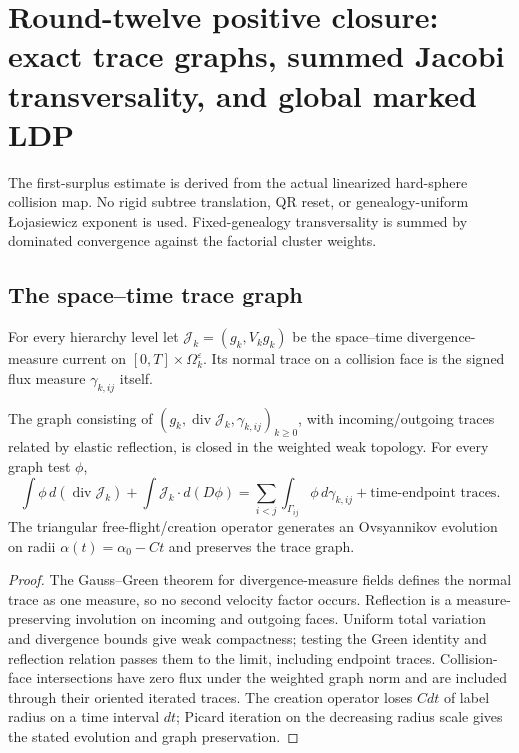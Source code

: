 \section{Round-twelve positive closure: exact trace graphs, summed Jacobi transversality, and global marked LDP}
\label{sec:r12-b2}

The first-surplus estimate is derived from the actual linearized hard-sphere
collision map.  No rigid subtree translation, QR reset, or genealogy-uniform
\L{}ojasiewicz exponent is used.  Fixed-genealogy transversality is summed by
dominated convergence against the factorial cluster weights.

\subsection{The space--time trace graph}

For every hierarchy level let
$\mathcal J_k=(g_k,V_kg_k)$ be the space--time divergence-measure current on
$[0,T]\times\Omega_k^\varepsilon$.  Its normal trace on a collision face is
the signed flux measure $\gamma_{k,ij}$ itself.

\begin{theorem}
\label{thm:r12-b2-trace}
The graph consisting of $(g_k,\operatorname{div}\mathcal J_k,
\gamma_{k,ij})_{k\ge0}$, with incoming/outgoing traces related by elastic
reflection, is closed in the weighted weak topology.  For every graph test
$\phi$,
\[
 \int\phi\,d(\operatorname{div}\mathcal J_k)
 +\int\mathcal J_k\cdot d(D\phi)
 =\sum_{i<j}\int_{\Gamma_{ij}}\phi\,d\gamma_{k,ij}
   +\text{time-endpoint traces}.
\]
The triangular free-flight/creation operator generates an Ovsyannikov
evolution on radii $\alpha(t)=\alpha_0-Ct$ and preserves the trace graph.
\end{theorem}

\begin{proof}
The Gauss--Green theorem for divergence-measure fields defines the normal
trace as one measure, so no second velocity factor occurs.  Reflection is a
measure-preserving involution on incoming and outgoing faces.  Uniform total
variation and divergence bounds give weak compactness; testing the Green
identity and reflection relation passes them to the limit, including endpoint
traces.  Collision-face intersections have zero flux under the weighted graph
norm and are included through their oriented iterated traces.  The creation
operator loses $Cdt$ of label radius on a time interval $dt$; Picard iteration
on the decreasing radius scale gives the stated evolution and graph
preservation.
\end{proof}

